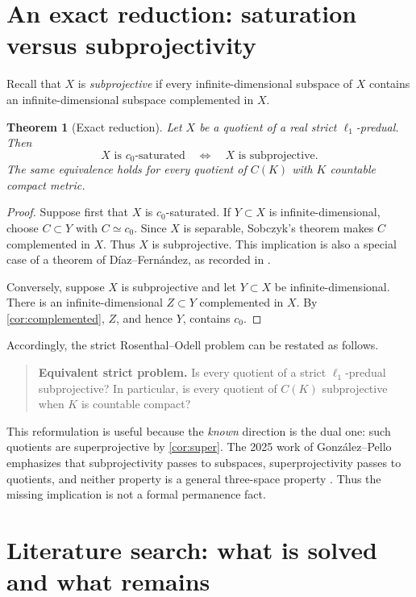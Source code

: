 \documentclass[11pt]{article}
\newtheorem{theorem}{Theorem}[section]
\theoremstyle{definition}
\newcommand{\isom}{\simeq}
\begin{document}
\section{An exact reduction: saturation versus subprojectivity}

Recall that $X$ is \emph{subprojective} if every infinite-dimensional
subspace of $X$ contains an infinite-dimensional subspace complemented in
$X$.

\begin{theorem}[Exact reduction]\label{thm:equiv}
Let $X$ be a quotient of a real strict $\ell_1$-predual.  Then
\[
   X \text{ is }c_0\text{-saturated}
   \quad\Longleftrightarrow\quad
   X \text{ is subprojective}.
\]
The same equivalence holds for every quotient of $C(K)$ with $K$ countable
compact metric.
\end{theorem}

\begin{proof}
Suppose first that $X$ is $c_0$-saturated.  If $Y\subset X$ is
infinite-dimensional, choose $C\subset Y$ with $C\isom c_0$.  Since $X$ is
separable, Sobczyk's theorem makes $C$ complemented in $X$.  Thus $X$ is
subprojective.  This implication is also a special case of a theorem of
D\'iaz--Fern\'andez, as recorded in
\cite[Proposition~2.7]{GalegoGonzalezPello2017}.

Conversely, suppose $X$ is subprojective and let $Y\subset X$ be
infinite-dimensional.  There is an infinite-dimensional $Z\subset Y$
complemented in $X$.  By \cref{cor:complemented}, $Z$, and hence $Y$,
contains $c_0$.
\end{proof}

Accordingly, the strict Rosenthal--Odell problem can be restated as follows.

\begin{quote}
\textbf{Equivalent strict problem.} Is every quotient of a strict
$\ell_1$-predual subprojective?  In particular, is every quotient of
$C(K)$ subprojective when $K$ is countable compact?
\end{quote}

This reformulation is useful because the \emph{known} direction is the dual
one: such quotients are superprojective by \cref{cor:super}.  The 2025 work of
Gonz\'alez--Pello emphasizes that subprojectivity passes to subspaces,
superprojectivity passes to quotients, and neither property is a general
three-space property \cite{GonzalezPello2025}.  Thus the missing implication
is not a formal permanence fact.

\section{Literature search: what is solved and what remains}
\end{document}
